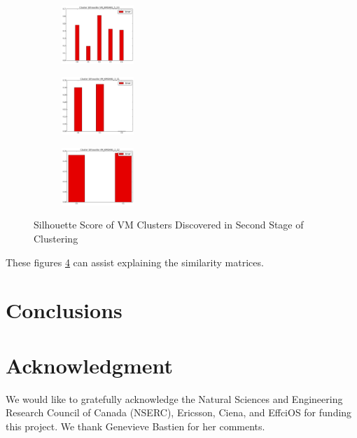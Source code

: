 \documentclass[10pt, conference, compsocconf]{IEEEtran}
\begin{document}
\begin{figure}
	\begin{subfigure}
		\centering
		\includegraphics[width=0.3\textwidth]{figs/VM_KMEANS_5_C0_sil.png}
		\label{fig:c0-sil}
	\end{subfigure}%
	\begin{subfigure}
		\centering
		\includegraphics[width=0.3\textwidth]{figs/VM_KMEANS_3_C1_sil.png}
		\label{fig:c1-sil}
	\end{subfigure}%
	\begin{subfigure}
		\centering
		\includegraphics[width=0.3\textwidth]{figs/VM_KMEANS_2_C2_sil.png}
		\label{fig:c2-sil}
	\end{subfigure}%
	\caption{Silhouette Score of VM Clusters Discovered in Second Stage of Clustering}
	\label{fig:2nd-sil}
\end{figure}
These figures \ref{fig:2nd-sil} can assist explaining the similarity matrices. 


\section{Conclusions}






\section*{Acknowledgment}

We would like to gratefully acknowledge the Natural Sciences and Engineering Research Council of Canada (NSERC), Ericsson, Ciena, and EffciOS for funding this project. We thank Genevieve Bastien for her comments.





\end{document}
